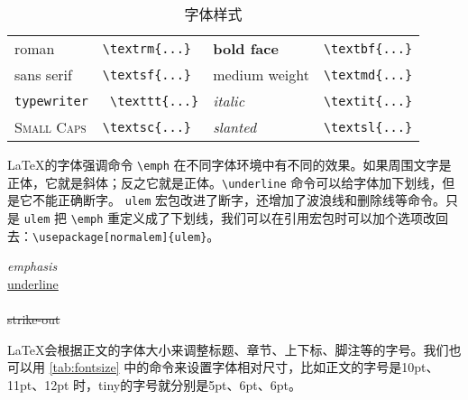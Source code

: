 \begin{table}[hbtp]
\centering
\caption{字体样式}
\label{tab:font_style}
\begin{tabular}{llll}
    \toprule
    \textrm{roman} & \verb|\textrm{...}| & 
        \textbf{bold face} & \verb|\textbf{...}| \\
    \textsf{sans serif} & \verb|\textsf{...}| & 
        \textmd{medium weight} & \verb|\textmd{...}| \\
    \texttt{typewriter} & \verb| \texttt{...}| & 
        \textit{italic} & \verb|\textit{...}| \\
    \textsc{Small Caps} & \verb|\textsc{...}| & 
        \textsl{slanted} & \verb|\textsl{...}| \\
    \bottomrule
\end{tabular}
\end{table}

\LaTeX 的字体强调命令 \verb|\emph| 在不同字体环境中有不同的效果。如果周围文字是正体，它就是斜体；反之它就是正体。\verb|\underline| 命令可以给字体加下划线，但是它不能正确断字。 \texttt{ulem} 宏包改进了断字，还增加了波浪线和删除线等命令。只是 \texttt{ulem} 把 \verb|\emph| 重定义成了下划线，我们可以在引用宏包时可以加个选项改回去：\verb|\usepackage[normalem]{ulem}|。

\begin{example}[h]
\begin{RLDemo}[]
\emph{emphasis}\\
\uline{underline}\\
\\
\sout{strike-out}
\end{RLDemo}
\caption{字体强调和下划线}
\end{example}

\LaTeX 会根据正文的字体大小来调整标题、章节、上下标、脚注等的字号。我们也可以用 \autoref{tab:fontsize} 中的命令来设置字体相对尺寸，比如正文的字号是10pt、11pt、12pt 时，tiny的字号就分别是5pt、6pt、6pt。

